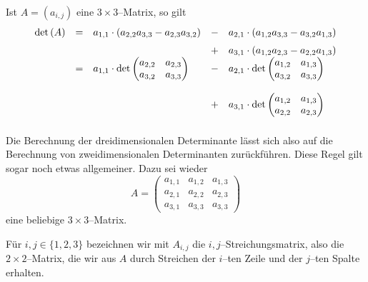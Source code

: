 \begin{satz}\label{det_laplace_3_spat} Ist $A = \left(a_{i,j}\right)$ eine 
$3 \times 3$--Matrix, so gilt
  	$$ \begin{array} {l c l c l }
  	\det{A} & = & a_{1,1} \cdot \left( a_{2,2} a_{3,3} - a_{2,3} a_{3,2} \right) & - & 
    	a_{2,1} \cdot \left( a_{1,2} a_{3,3} - a_{3,2} a_{1,3} \right) \\
  	& &   & + &
  	a_{3,1} \cdot \left( a_{1,2} a_{2,3} - a_{2,2} a_{1,3} \right) \\
  	& = & a_{1,1} \cdot \det{ \begin{matrix} a_{2,2} & a_{2,3} \\ a_{3,2} & a_{3,3} \end{matrix}}  & - &
  	a_{2,1} \cdot \det{ \begin{matrix} a_{1,2} & a_{1,3} \\ a_{3,2} & a_{3,3} \end{matrix}}  \\
 	& &  & + &
   	a_{3,1} \cdot \det{ \begin{matrix} a_{1,2} & a_{1,3} \\ a_{2,2} & a_{2,3} \end{matrix}}
  	\end{array} $$
\end{satz}

Die Berechnung der dreidimensionalen Determinante lässt sich also auf die Berechnung von zweidimensionalen 
Determinanten zurückführen. Diese Regel gilt sogar noch etwas allgemeiner. Dazu sei wieder
  	$$ A = \left( \begin{matrix} a_{1,1} & a_{1,2} & a_{1,3} \\ a_{2,1} & a_{2,2} & a_{2,3} \\
    	a_{3,1} & a_{3,3} & a_{3,3} \end{matrix} \right) $$
eine beliebige $3 \times 3$--Matrix.

\begin{definition} Für $i, j \in \{1, 2, 3\}$ bezeichnen wir mit $A_{i,j}$ die 
$i,j$--Strei\-chungs\-matrix, 
also die $2 \times 2$--Matrix, die wir aus $A$ durch Streichen der $i$--ten Zeile und der $j$--ten Spalte 
erhalten.
\end{definition}

